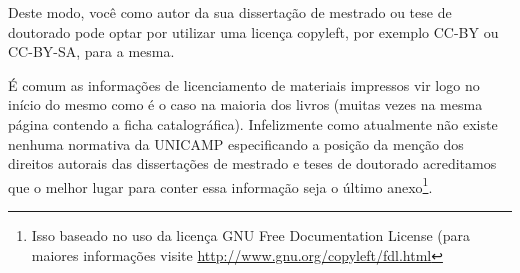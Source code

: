 Deste modo, você como autor da sua dissertação de mestrado ou tese de
doutorado pode optar por utilizar uma licença copyleft, por exemplo CC-BY ou
CC-BY-SA, para a mesma.

É comum as informações de licenciamento de materiais impressos vir logo no
início do mesmo como é o caso na maioria dos livros (muitas vezes na mesma
página contendo a ficha catalográfica). Infelizmente como atualmente não existe
nenhuma normativa da UNICAMP especificando a posição da menção dos direitos
autorais das dissertações de mestrado e teses de doutorado acreditamos que o
melhor lugar para conter essa informação seja o último anexo\footnote{Isso
baseado no uso da licença GNU Free Documentation License (para maiores
informações visite \url{http://www.gnu.org/copyleft/fdl.html}}.